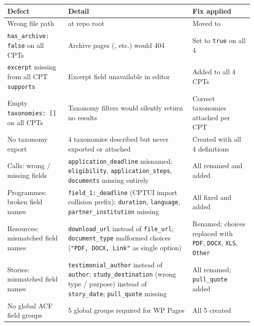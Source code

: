\documentclass[12pt,a4paper]{article}
\begin{document}
\begin{longtable}{@{}L{3.8cm}L{5.2cm}L{4.2cm}@{}}
\toprule
{}
\textbf{Defect} & \textbf{Detail} & \textbf{Fix applied} \\
\midrule
\endhead
Wrong file path
    &  at repo root
    & Moved to  \\
\addlinespace
\texttt{has\_archive: false} on all CPTs
    & Archive pages (,  etc.) would 404
    & Set to \texttt{true} on all 4 \\
\addlinespace
\texttt{excerpt} missing from all CPT \texttt{supports}
    & Excerpt field unavailable in editor
    & Added to all 4 CPTs \\
\addlinespace
Empty \texttt{taxonomies: []} on all CPTs
    & Taxonomy filters would silently return no results
    & Correct taxonomies attached per CPT \\
\addlinespace
No taxonomy export
    & 4 taxonomies described but never exported or attached
    & Created  with all 4 definitions \\
\addlinespace
Calls: wrong / missing fields
    & \texttt{application\_deadline} misnamed; \texttt{eligibility},
      \texttt{application\_steps}, \texttt{documents} missing entirely
    & All renamed and added \\
\addlinespace
Programmes: broken field names
    & \texttt{field\_1:\_deadline} (CPTUI import collision prefix);
      \texttt{duration}, \texttt{language}, \texttt{partner\_institution}
      missing
    & All fixed and added \\
\addlinespace
Resources: mismatched field names
    & \texttt{download\_url} instead of \texttt{file\_url};
      \texttt{document\_type} malformed choices
      (\texttt{"PDF, DOCX, Link"} as single option)
    & Renamed; choices replaced with \texttt{PDF}, \texttt{DOCX},
      \texttt{XLS}, \texttt{Other} \\
\addlinespace
Stories: mismatched field names
    & \texttt{testimonial\_author} instead of \texttt{author};
      \texttt{study\_destination} (wrong type / purpose) instead of
      \texttt{story\_date}; \texttt{pull\_quote} missing
    & All renamed; \texttt{pull\_quote} added \\
\addlinespace
No global ACF field groups
    & 5 global groups required for WP Pages
    & All 5 created \\
\bottomrule
\end{longtable}
\end{document}
